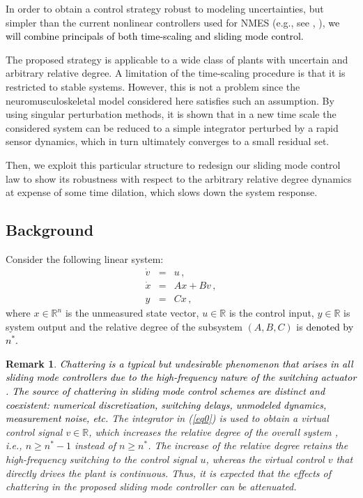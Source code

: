 \documentclass[review]{elsarticle}
\newtheorem{remark}{Remark}
\begin{document}
In order to obtain a control strategy robust to modeling uncertainties, but
simpler than the current nonlinear controllers used for NMES (e.g., see \cite{BFF:2015}, \cite{FHBC:2009}), \textcolor{black}{we will combine principals of both time-scaling and sliding mode control.} 

The proposed strategy is applicable to a wide class of plants with uncertain and arbitrary relative degree. A limitation of the time-scaling procedure is that it is restricted to stable systems. However, this is not a problem since the neuromusculoskeletal model considered here satisfies such an assumption. By using singular perturbation methods, it is shown that in a new time scale the considered system can be reduced to a simple integrator perturbed by a rapid sensor dynamics, which in turn ultimately converges to a small residual set.


Then, we exploit this particular structure to redesign our sliding mode control law to show its robustness
with respect to the arbitrary relative degree dynamics at expense of some time dilation, which slows
down the system response.




\subsection{Background}

Consider the following linear system:
%
\begin{eqnarray}
    \dot v &=& u \,,      \label{eq0}\\
    \dot{x}&=& Ax+Bv \,,  \label{eq1}  \\
    y&=&Cx \,,            \label{outupunmeasured}
\end{eqnarray}
%
where $x \in
\mathbb{R}^n$ is the unmeasured state vector, $u \in \mathbb{R}$ is the control input, $y \in \mathbb{R}$ is system output
and the relative degree of the subsystem $(A,B,C)$ is \textcolor{black}{denoted by $n^*$.} 
%
\begin{remark}
\textcolor{black}{\textit{Chattering} is a typical but undesirable phenomenon that arises in all sliding mode controllers due to the high-frequency nature of the switching actuator \cite{UGS:99}. The source of chattering in sliding mode control schemes are distinct and coexistent: numerical discretization, switching delays, unmodeled dynamics, measurement noise, etc.} 
The integrator in (\ref{eq0}) is used to obtain a virtual control signal
$v \in \mathbb{R}$, which increases the relative degree of the overall system \cite{Lev:03}, \textit{i.e.},
$n\geq n^*-1$ instead of $n\geq n^*$. The increase of the relative degree retains the high-frequency switching to the control signal $u$,
whereas the virtual control $v$ that directly drives the plant is continuous.
Thus, it is expected that the effects of chattering in the proposed sliding mode controller can be attenuated.
%
\end{remark}
\end{document}
